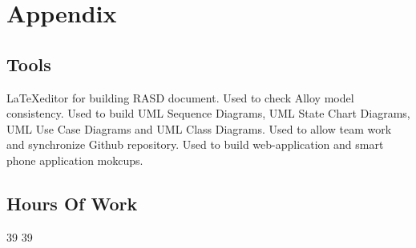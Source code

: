 \section{Appendix}
\subsection{Tools}
\begin{itemize}
	 \LaTeX editor for building RASD document.
	 Used to check Alloy model consistency.
	 Used to build UML Sequence Diagrams, UML State Chart Diagrams, UML Use Case Diagrams and UML Class Diagrams.
	 Used to allow team work and synchronize Github repository.
	 Used to build web-application and smart phone application mokcups.
\end{itemize}
\subsection{Hours Of Work}
\begin{itemize}
	 39
	 39
\end{itemize}

